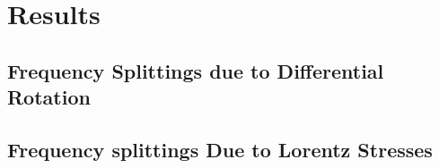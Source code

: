 \chapter{Results}  %

\ifpdf
    \graphicspath{{Chapter1/Figs/Raster/}{Chapter1/Figs/PDF/}{Chapter1/Figs/}}
\else
    \graphicspath{{Chapter1/Figs/Vector/}{Chapter1/Figs/}}
\fi

\section{Frequency Splittings due to Differential Rotation} %



\section{Frequency splittings Due to Lorentz Stresses} %
